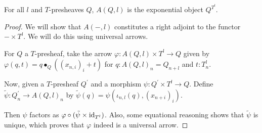 \begin{lemma}
  For all $ l $ and $ T $-presheaves $ Q $, $ A(Q, l) $ is the exponential object $ Q^{T^l} $.
\end{lemma}
\begin{proof}
  We will show that $ A(-, l) $ constitutes a right adjoint to the functor $ - \times T^l $. We will do this using universal arrows.

  For $ Q $ a $ T $-presheaf, take the arrow $ \varphi: A(Q, l) \times T^l \to Q $ given by $ \varphi(q, t) = q \bullet_Q ((x_{n, i})_i + t) $ for $ q: A(Q, l)_n = Q_{n + l} $ and $ t: T^l_n $.

  Now, given a $ T $-presheaf $ Q^\prime $ and a morphism $ \psi: Q^\prime \times T^l \to Q $. Define $ \tilde \psi: Q^\prime_n \to A(Q, l)_n $ by $ \tilde \psi(q) = \psi(\iota_{n, l}(q), (x_{n + i})_i) $.

  Then $ \psi $ factors as $ \varphi \circ (\tilde \psi \times \text{id}_{T^l}) $. Also, some equational reasoning shows that $ \tilde \psi $ is unique, which proves that $ \varphi $ indeed is a universal arrow.
\end{proof}
